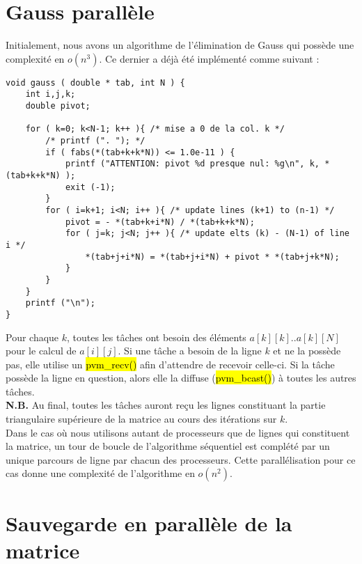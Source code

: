 \documentclass[a4paper,table]{article}
\begin{document}



\newpage

\section{Gauss parallèle}

Initialement, nous avons un algorithme de l'élimination de Gauss qui possède
une complexité en $o(n^{3})$. Ce dernier a déjà été implémenté comme suivant : \\

\begin{lstlisting}
void gauss ( double * tab, int N ) {
	int i,j,k;
	double pivot;

	for ( k=0; k<N-1; k++ ){ /* mise a 0 de la col. k */
		/* printf (". "); */
		if ( fabs(*(tab+k+k*N)) <= 1.0e-11 ) {
			printf ("ATTENTION: pivot %d presque nul: %g\n", k, *(tab+k+k*N) );
			exit (-1);
		}
		for ( i=k+1; i<N; i++ ){ /* update lines (k+1) to (n-1) */
			pivot = - *(tab+k+i*N) / *(tab+k+k*N);
			for ( j=k; j<N; j++ ){ /* update elts (k) - (N-1) of line i */
				*(tab+j+i*N) = *(tab+j+i*N) + pivot * *(tab+j+k*N);
			}
		}
	}
	printf ("\n");
}
\end{lstlisting}

Pour chaque $k$, toutes les tâches ont besoin des éléments $a[k][k]..a[k][N]$ pour
le calcul de $a[i][j]$. Si une tâche a besoin de la ligne $k$ et ne la possède pas,
elle utilise un \hl{pvm\_recv()} afin d'attendre de recevoir celle-ci. Si la tâche
possède la ligne en question, alors elle la diffuse (\hl{pvm\_bcast()}) à toutes
les autres tâches.\\

\textbf{N.B.} Au final, toutes les tâches auront reçu les lignes constituant la
partie triangulaire supérieure de la matrice au cours des itérations sur $k$.\\

Dans le cas où nous utilisons autant de processeurs que de lignes qui
constituent la matrice, un tour de boucle de l'algorithme séquentiel est
complété par un unique parcours de ligne par chacun des processeurs. Cette
parallélisation pour ce cas donne une complexité de l'algorithme en $o(n^{2})$. \\


\newpage

\section{Sauvegarde en parallèle de la matrice}
\end{document}
